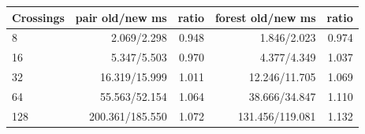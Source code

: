 \begin{center}\small
\begin{tabular}{@{}lrrrr@{}}
\toprule
Crossings & pair old/new ms & ratio & forest old/new ms & ratio \\
\midrule
8 & 2.069/2.298 & 0.948 & 1.846/2.023 & 0.974 \\
16 & 5.347/5.503 & 0.970 & 4.377/4.349 & 1.037 \\
32 & 16.319/15.999 & 1.011 & 12.246/11.705 & 1.069 \\
64 & 55.563/52.154 & 1.064 & 38.666/34.847 & 1.110 \\
128 & 200.361/185.550 & 1.072 & 131.456/119.081 & 1.132 \\
\bottomrule
\end{tabular}
\end{center}
